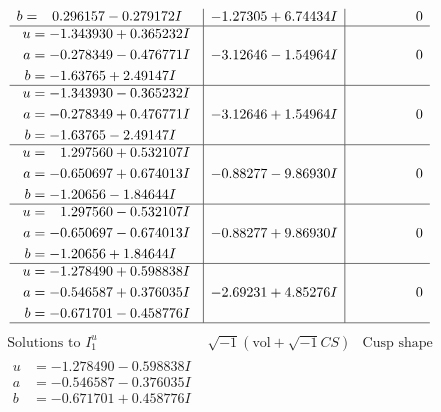 \documentclass[1p]{elsarticle_modified}
\theoremstyle{definition}
\newcommand{\I}{\sqrt{-1}}
\begin{document}
$$\begin{array}{c|c|c}
\begin{aligned}
b &= \phantom{-}0.296157 - 0.279172 I\end{aligned}
 & -1.27305 + 6.74434 I & \phantom{-0.000000 } 0 \\ \hline\begin{aligned}
u &= -1.343930 + 0.365232 I \\
a &= -0.278349 - 0.476771 I \\
b &= -1.63765 + 2.49147 I\end{aligned}
 & -3.12646 - 1.54964 I & \phantom{-0.000000 } 0 \\ \hline\begin{aligned}
u &= -1.343930 - 0.365232 I \\
a &= -0.278349 + 0.476771 I \\
b &= -1.63765 - 2.49147 I\end{aligned}
 & -3.12646 + 1.54964 I & \phantom{-0.000000 } 0 \\ \hline\begin{aligned}
u &= \phantom{-}1.297560 + 0.532107 I \\
a &= -0.650697 + 0.674013 I \\
b &= -1.20656 - 1.84644 I\end{aligned}
 & -0.88277 - 9.86930 I & \phantom{-0.000000 } 0 \\ \hline\begin{aligned}
u &= \phantom{-}1.297560 - 0.532107 I \\
a &= -0.650697 - 0.674013 I \\
b &= -1.20656 + 1.84644 I\end{aligned}
 & -0.88277 + 9.86930 I & \phantom{-0.000000 } 0 \\ \hline\begin{aligned}
u &= -1.278490 + 0.598838 I \\
a &= -0.546587 + 0.376035 I \\
b &= -0.671701 - 0.458776 I\end{aligned}
 & -2.69231 + 4.85276 I & \phantom{-0.000000 } 0\\
 \hline 
 \end{array}$$\newpage$$\begin{array}{c|c|c}  
\text{Solutions to }I^u_{1}& \I (\text{vol} + \sqrt{-1}CS) & \text{Cusp shape}\\
 \hline 
\begin{aligned}
u &= -1.278490 - 0.598838 I \\
a &= -0.546587 - 0.376035 I \\
b &= -0.671701 + 0.458776 I\end{aligned}

\end{array}$$
\end{document}
